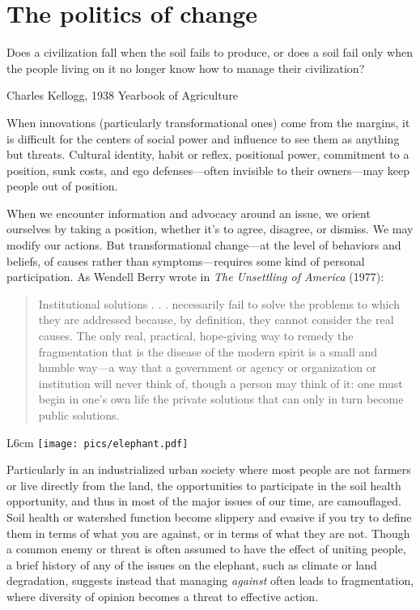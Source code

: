 \documentclass[11pt,letterpaper,twoside,onecolumn]{memoir}
\begin{document}
\section*{The politics of change}

\epigraph{Does a civilization fall when the soil fails to produce, or does a soil fail only when the people living on it no longer know how to manage their civilization?}{Charles Kellogg, 1938 Yearbook of Agriculture}

\noindent When innovations (particularly transformational ones) come from the margins, it is difficult for the centers of social power and influence to see them as anything but threats. Cultural identity, habit or reflex, positional power, commitment to a position, sunk costs, and ego defenses---often invisible to their owners---may keep people out of position.

When we encounter information and advocacy around an issue, we orient ourselves by taking a position, whether it's to agree, disagree, or dismiss. We may modify our actions. But transformational change---at the level of behaviors and beliefs, of causes rather than symptoms---requires some kind of personal participation. As Wendell Berry wrote in \textit{The Unsettling of America} (1977):

\begin{quotation}\noindent Institutional solutions . . . necessarily fail to solve the problems to which they are addressed because, by definition, they cannot consider the real causes. The only real, practical, hope-giving way to remedy the fragmentation that is the disease of the modern spirit is a small and humble way---a way that a government or agency or organization or institution will never think of, though a person may think of it: one must begin in one's own life the private solutions that can only in turn become public solutions.\end{quotation}

\begin{wrapfigure}{L}{6cm}
\centering
\vspace{-2em}
\texttt{[image: pics/elephant.pdf]}
\end{wrapfigure}

Particularly in an industrialized urban society where most people are not farmers or live directly from the land, the opportunities to participate in the soil health opportunity, and thus in most of the major issues of our time, are camouflaged. Soil health or watershed function become slippery and evasive if you try to define them in terms of what you are against, or in terms of what they are not. Though a common enemy or threat is often assumed to have the effect of uniting people, a brief history of any of the issues on the elephant, such as climate or land degradation, suggests instead that managing \textit{against} often leads to fragmentation, where diversity of opinion becomes a threat to effective action.
\end{document}
